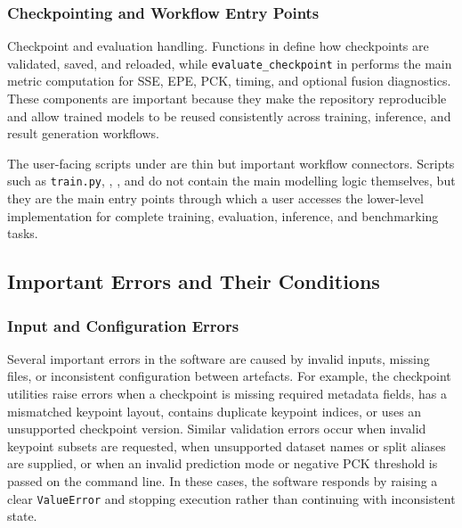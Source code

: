 ﻿\documentclass[11pt,a4paper]{article}
\begin{document}
\subsubsection*{Checkpointing and Workflow Entry Points}

Checkpoint and evaluation handling. 
Functions in  define how
checkpoints are validated, saved, and reloaded, while
\texttt{evaluate\_checkpoint} in
 performs the main
metric computation for SSE, EPE, PCK, timing, and optional fusion diagnostics.
These components are important because they make the repository reproducible
and allow trained models to be reused consistently across training, inference,
and result generation workflows.

\medskip

The user-facing scripts under  are thin but
important workflow connectors. Scripts such as \texttt{train.py},
, , and
 do not contain the main modelling logic
themselves, but they are the main entry points through which a user accesses
the lower-level implementation for complete training, evaluation, inference,
and benchmarking tasks.

\subsection{Important Errors and Their Conditions}

\subsubsection*{Input and Configuration Errors}

Several important errors in the software are caused by invalid inputs, missing
files, or inconsistent configuration between artefacts. For example, the
checkpoint utilities raise errors when a checkpoint is missing required
metadata fields, has a mismatched keypoint layout, contains duplicate keypoint
indices, or uses an unsupported checkpoint version. Similar validation errors
occur when invalid keypoint subsets are requested, when unsupported dataset
names or split aliases are supplied, or when an invalid prediction mode or
negative PCK threshold is passed on the command line.
In these cases, the software responds by raising a clear \texttt{ValueError}
and stopping execution rather than continuing with inconsistent state.
\end{document}
